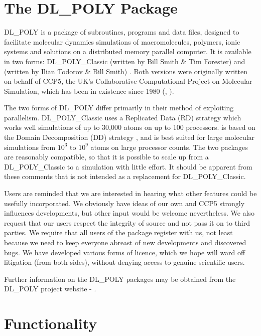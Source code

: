\section{The DL\_POLY Package}

DL\_POLY \cite{smith-96a} is a package of subroutines, programs and
data files, designed to facilitate molecular dynamics simulations of
macromolecules, polymers, ionic systems and solutions on a
distributed memory parallel computer. It is available in two forms:
DL\_POLY\_Classic (written by Bill Smith \& Tim Forester) and \D (written
by Ilian Todorov \& Bill Smith) \cite{todorov-04a}.  Both versions
were originally written on behalf of CCP5, the UK's
Collaborative Computational Project on Molecular Simulation, which
has been in existence since 1980 (\cite{smith-87a}, \WEB{}).

The two forms of DL\_POLY differ primarily in their method of
exploiting parallelism.  DL\_POLY\_Classic uses a Replicated Data (RD)
strategy \cite{smith-91a,smith-93a,smith-94a,smith-94b} which
works well simulations of up to 30,000 atoms on up to 100 processors.
\D is based on the Domain Decomposition (DD) strategy
\cite{todorov-04a,pinches-91a,rapaport-91b,smith-91a,smith-93a},
and is best suited for large molecular simulations from $10^{3}$
to $10^{9}$ atoms on large processor counts.  The two packages
are reasonably compatible, so that it is possible to scale up from
a DL\_POLY\_Classic to a \D simulation with little effort.  It should
be apparent from these comments that \D is not intended as a
replacement for DL\_POLY\_Classic.

Users are reminded that we are interested in hearing what other
features could be usefully incorporated.  We obviously have ideas
of our own and CCP5 strongly influences developments,
but other input would be welcome nevertheless.  We also request
that our users respect the integrity of \D source and not pass it
on to third parties.  We require that all users of the package
register with us, not least because we need to keep everyone
abreast of new developments and discovered bugs.  We have
developed various forms of licence, which we hope
will ward off litigation (from both sides), without denying access
to genuine scientific users.

Further information on the DL\_POLY packages may be obtained from
the DL\_POLY project website - \noindent \WEB{}.

\section{Functionality}

